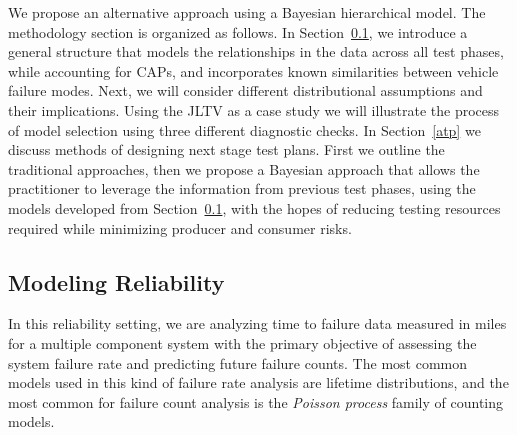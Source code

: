 \documentclass[12pt]{article}
\begin{document}
We propose an alternative approach using a Bayesian hierarchical
model.  The methodology section is organized as follows.  In Section~\ref{modrel}, we introduce a general structure that models the relationships in the
data across all test phases, while accounting for CAPs, and incorporates known
similarities between vehicle failure modes.  Next, we will consider different
distributional assumptions and their implications.  Using the JLTV as a case study we
will illustrate the process of model selection using three different diagnostic
checks.  In Section~\ref{atp} we discuss methods of designing next stage test plans.
First we outline the traditional approaches, then we propose a Bayesian
approach that allows the practitioner to leverage the information from previous test phases, using the models developed from Section~\ref{modrel}, with the hopes of reducing testing resources required while minimizing producer and consumer risks.

\subsection{Modeling Reliability}\label{modrel}
In this reliability setting, we are analyzing time to failure data measured in
miles for a multiple component system with the primary objective of
assessing the system failure rate and predicting future failure counts.
The most common models used in this kind of failure rate analysis are lifetime
distributions, and the most common for failure count analysis is the
\emph{Poisson process} family of counting models.
\end{document}
